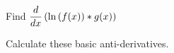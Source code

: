 \begin{questions}
\question Find $\displaystyle \displaystyle \frac{d}{dx}\left(\ln\left(f(x)\right)*g(x)\right)$
\begin{solutionorbox}[2.5in]

\end{solutionorbox}

\newpage

\question Calculate these basic anti-derivatives.
\begin{multicols}{3}


\end{multicols}
\end{questions}
